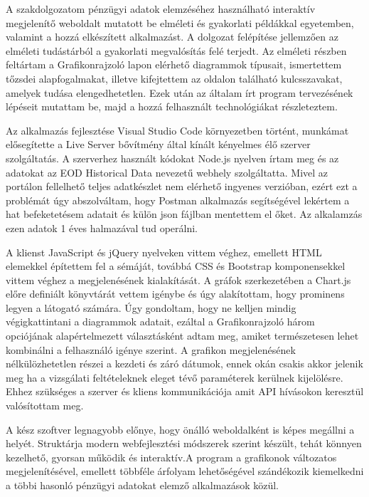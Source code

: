 
A szakdolgozatom pénzügyi adatok elemzéséhez használható interaktív megjelenítő weboldalt mutatott be elméleti és gyakorlati példákkal egyetemben, valamint a hozzá elkészített alkalmazást. A dolgozat felépítése jellemzően az elméleti tudástárból a gyakorlati megvalósítás felé terjedt. Az elméleti részben feltártam a Grafikonrajzoló lapon elérhető diagrammok típusait, ismertettem tőzsdei alapfogalmakat, illetve kifejtettem az oldalon található kulcsszavakat, amelyek tudása elengedhetetlen. Ezek után az általam írt program tervezésének lépéseit mutattam be, majd a hozzá felhasznált technológiákat részleteztem.

	Az alkalmazás fejlesztése Visual Studio Code környezetben történt, munkámat elősegítette a Live Server bővítmény által kínált kényelmes élő szerver szolgáltatás. A szerverhez használt kódokat Node.js nyelven írtam meg és az adatokat az EOD Historical Data nevezetű webhely szolgáltatta. Mivel az portálon fellelhető teljes adatkészlet nem elérhető ingyenes verzióban, ezért ezt a problémát úgy abszolváltam, hogy Postman alkalmazás segítségével lekértem a hat befeketetésem adatait és külön json fájlban mentettem el őket. Az alkalamzás ezen adatok 1 éves halmazával tud operálni. 

	A klienst JavaScript és jQuery nyelveken vittem véghez, emellett HTML elemekkel építettem fel a sémáját, továbbá CSS és Bootstrap komponensekkel vittem véghez a megjelenésének kialakítását. A gráfok szerkezetében a Chart.js előre definiált könyvtárát vettem igénybe és úgy alakítottam, hogy prominens legyen a látogató számára. Úgy gondoltam, hogy ne kelljen mindig végigkattintani a diagrammok adatait, ezáltal a Grafikonrajzoló három opciójának alapértelmezett választásként adtam meg, amiket természetesen lehet kombinálni a felhasználó igénye szerint. A grafikon megjelenésének nélkülözhetetlen részei a kezdeti és záró dátumok, ennek okán csakis akkor jelenik meg ha a vizsgálati feltételeknek eleget tévő paraméterek kerülnek kijelölésre. Ehhez szükséges a szerver és kliens kommunikációja amit API hívásokon keresztül valósítottam meg.

	A kész szoftver legnagyobb előnye, hogy önálló weboldalként is képes megállni a helyét. Struktárja modern webfejlesztési módszerek szerint készült, tehát könnyen kezelhető, gyorsan működik és interaktív.A program a grafikonok változatos megjelenítésével, emellett többféle árfolyam lehetőségével szándékozik kiemelkedni a többi hasonló pénzügyi adatokat elemző alkalmazások közül. 

